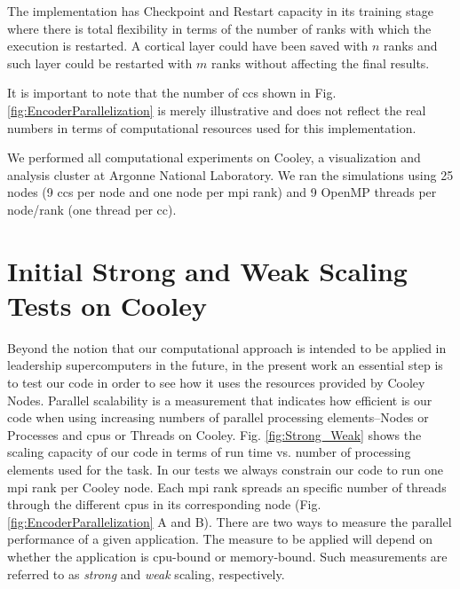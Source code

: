 \documentclass{book}
\begin{document}
\begin{appendices}
The implementation has Checkpoint and Restart capacity in its training stage where there is total flexibility in terms of the number of ranks with which the execution is restarted. A cortical layer could have been saved with $n$ ranks and such layer could be restarted with $m$ ranks without affecting the final results.

It is important to note that the number of \glspl{cc} shown in Fig. \ref{fig:EncoderParallelization} is merely illustrative and does not reflect the real numbers in terms of computational resources used for this implementation. 

We performed all computational experiments on Cooley, a visualization and analysis cluster at Argonne National Laboratory. We ran the simulations using 25 nodes (9 \glspl{cc} per node and one node per \gls{mpi} rank) and 9 OpenMP threads per node/rank (one thread per \gls{cc}).

\section{Initial Strong and Weak Scaling Tests on Cooley}

Beyond the notion that our computational approach is intended to be applied in leadership supercomputers in the future, in the present work an essential step is to test our code in order to see how it uses the resources provided by Cooley Nodes. Parallel scalability is a measurement that indicates how efficient is our code when using increasing numbers of parallel processing elements--Nodes or Processes and \glspl{cpu} or Threads on Cooley. Fig. \ref{fig:Strong_Weak} shows the scaling capacity of our code in terms of run time vs. number of processing elements used for the task. In our tests we always constrain our code to run one \gls{mpi} rank per Cooley node. Each \gls{mpi} rank spreads an specific number of threads through the different \glspl{cpu} in its corresponding node (Fig. \ref{fig:EncoderParallelization} A and B). There are two ways to measure the parallel performance of a given application. The measure to be applied will depend on whether the application is \gls{cpu}-bound or memory-bound. Such measurements are referred to as \emph{strong} and \emph{weak} scaling, respectively.


\end{appendices}
\end{document}
